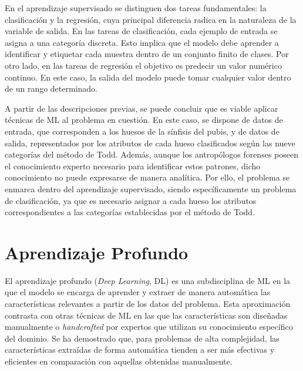 En el aprendizaje supervisado se distinguen dos tareas fundamentales: la clasificación y la regresión, cuya principal diferencia radica en la naturaleza de la variable de salida. En las tareas de clasificación, cada ejemplo de entrada se asigna a una categoría discreta. Esto implica que el modelo debe aprender a identificar y etiquetar cada muestra dentro de un conjunto finito de clases. Por otro lado, en las tareas de regresión el objetivo es predecir un valor numérico continuo. En este caso, la salida del modelo puede tomar cualquier valor dentro de un rango determinado.

A partir de las descripciones previas, se puede concluir que es viable aplicar técnicas de ML al problema en cuestión. En este caso, se dispone de datos de entrada, que corresponden a los huesos de la sínfisis del pubis, y de datos de salida, representados por los atributos de cada hueso clasificados según las nueve categorías del método de Todd. Además, aunque los antropólogos forenses poseen el conocimiento experto necesario para identificar estos patrones, dicho conocimiento no puede expresarse de manera analítica. Por ello, el problema se enmarca dentro del aprendizaje supervisado, siendo específicamente un problema de clasificación, ya que es necesario asignar a cada hueso los atributos correspondientes a las categorías establecidas por el método de Todd.

\section{Aprendizaje Profundo}
\label{section2:DL}
El aprendizaje profundo (\textit{Deep Learning}, DL) \cite{Goodfellow-et-al-2016, bishop_deep_2024, prince_understanding_2023, lecun_deep_2015, schmidhuber_deep_2015} es una subdisciplina de ML en la que el modelo se encarga de aprender y extraer de manera automática las características relevantes a partir de los datos del problema. Esta aproximación contrasta con otras técnicas de ML en las que las características son diseñadas manualmente o \textit{handcrafted} por expertos que utilizan su conocimiento específico del dominio. Se ha demostrado que, para problemas de alta complejidad, las características extraídas de forma automática tienden a ser más efectivas y eficientes en comparación con aquellas obtenidas manualmente.

